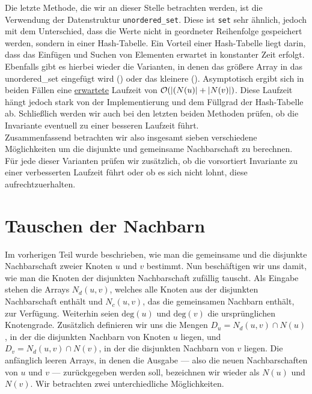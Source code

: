 Die letzte Methode, die wir an dieser Stelle betrachten werden,
ist die Verwendung der Datenstruktur \texttt{unordered\_set}. Diese ist \texttt{set} sehr ähnlich, jedoch mit
dem Unterschied, dass die Werte nicht in geordneter Reihenfolge gespeichert werden, sondern
in einer Hash-Tabelle. Ein Vorteil einer Hash-Tabelle liegt darin, 
dass das Einfügen und Suchen von Elementen
erwartet in konstanter Zeit erfolgt.
Ebenfalls gibt es hierbei wieder die Varianten, 
in denen das größere Array in das unordered\_set eingefügt wird (\USetSea) 
oder das kleinere (\SeaUSet).{}
Asymptotisch ergibt sich in beiden Fällen eine \underline{erwartete} Laufzeit von $\mathcal{O}(|(N(u)| + |N(v)|)$.
Diese Laufzeit hängt jedoch stark von der Implementierung und dem Füllgrad  der Hash-Tabelle ab. 
Schließlich werden wir auch bei den letzten beiden Methoden prüfen,
 ob die Invariante eventuell zu einer besseren Laufzeit führt.
\\

Zusammenfassend betrachten wir also insgesamt sieben verschiedene Möglichkeiten um die disjunkte
und gemeinsame Nachbarschaft zu berechnen. Für jede dieser Varianten prüfen wir zusätzlich,
ob die vorsortiert Invariante zu einer verbesserten Laufzeit führt oder ob es sich
nicht lohnt, diese aufrechtzuerhalten.



\section{Tauschen der Nachbarn}
\label{sec:trade}
Im vorherigen Teil wurde beschrieben, wie man die gemeinsame und die disjunkte Nachbarschaft zweier Knoten
$u$ und $v$ bestimmt. Nun beschäftigen wir uns damit, wie man die Knoten der disjunkten Nachbarschaft zufällig tauscht. Als Eingabe 
stehen die Arrays $N_{d}(u,v)$, welches alle Knoten aus der disjunkten Nachbarschaft enthält
und $N_{c}(u,v)$, das die gemeinsamen Nachbarn enthält, zur Verfügung. Weiterhin seien $\text{deg}(u)$ und
$\text{deg}(v)$ die ursprünglichen Knotengrade. Zusätzlich definieren wir uns die Mengen
$D_{u} = N_{d}(u,v) \cap N(u)$, in der die disjunkten Nachbarn von Knoten $u$ liegen, 
und $D_{v} = N_{d}(u,v) \cap N(v)$, in der die disjunkten Nachbarn von $v$ liegen. Die anfänglich
leeren Arrays, in denen die Ausgabe --- also die neuen Nachbarschaften von $u$ und $v$ --- zurückgegeben 
werden soll, bezeichnen wir wieder als $N(u)$ und $N(v)$.
Wir betrachten zwei unterchiedliche Möglichkeiten.
\\

